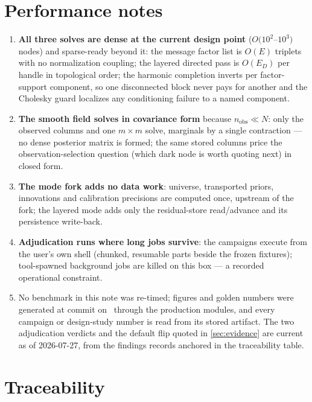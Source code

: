 \documentclass[11pt]{article}
\begin{document}
\section{Performance notes}
\label{app:perf}

\begin{enumerate}[leftmargin=1.6em]
\item \textbf{All three solves are dense at the current design point}
($O(10^2$--$10^3)$ nodes) and sparse-ready beyond it: the message factor
list is $O(E)$ triplets with no normalization coupling; the layered
directed pass is $O(E_D)$ per handle in topological order; the harmonic
completion inverts per factor-support component, so one disconnected
block never pays for another and the Cholesky guard localizes any
conditioning failure to a named component.
\item \textbf{The smooth field solves in covariance form} because
$n_{\mathrm{obs}}\ll N$: only the observed columns and one
$m\times m$ solve, marginals by a single contraction --- no dense
posterior matrix is formed; the same stored columns price the
observation-selection question (which dark node is worth quoting next)
in closed form.
\item \textbf{The mode fork adds no data work}: universe, transported
priors, innovations and calibration precisions are computed once,
upstream of the fork; the layered mode adds only the residual-store
read/advance and its persistence write-back.
\item \textbf{Adjudication runs where long jobs survive}: the campaigns
execute from the user's own shell (chunked, resumable parts beside the
frozen fixtures); tool-spawned background jobs are killed on this box ---
a recorded operational constraint.
\item No benchmark in this note was re-timed; figures and golden numbers
were generated at commit \texttt{\gtpgencommit} on \gtpgendate\ through
the production modules, and every campaign or design-study number is
read from its stored artifact.  The two adjudication verdicts and the
default flip quoted in \cref{sec:evidence} are current as of 2026-07-27,
from the findings records anchored in the traceability table.
\end{enumerate}

\section{Traceability}
\label{app:trace}
\end{document}
